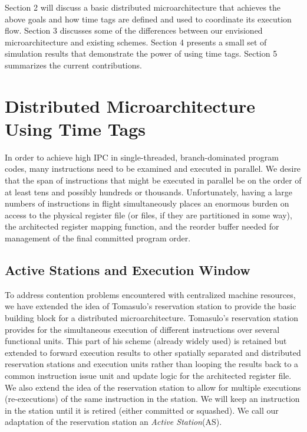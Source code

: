 \documentclass[10pt,twocolumn,dvips]{article}
\begin{document}
Section 2 will discuss a basic distributed microarchitecture that
achieves the above goals and how time tags are defined and used
to coordinate its execution flow.  
Section 3 discusses some of the differences between our envisioned
microarchitecture and existing schemes.
Section 4 presents a small set of simulation results that demonstrate
the power of using time tags. 
Section 5 
summarizes the current contributions.
\section{Distributed Microarchitecture Using Time Tags}
\vspace{-0.1in}
In order to achieve high IPC in single-threaded, branch-dominated 
program codes, many instructions need to be examined and executed
in parallel.  We desire that the span of instructions that might be
executed in parallel be on the order of at least tens and possibly hundreds
or thousands.  Unfortunately, having a large numbers of instructions
in flight simultaneously places an enormous burden on access to 
the physical register file (or files, if they are partitioned in some way),
the architected register mapping function, and the reorder buffer 
needed for
management of the final committed program order.
\vspace{-0.2in}
\subsection{Active Stations and Execution Window}
\vspace{-0.1in}
To address contention problems encountered with centralized
machine resources, we have extended the idea of Tomasulo's reservation
station \cite{Tom67} to provide the basic building block for a distributed
microarchitecture.  Tomasulo's reservation station provides for the
simultaneous execution of different instructions over several
functional units.  This part of his scheme (already widely used) is
retained but extended to forward execution results to other spatially
separated and distributed reservation stations and execution units
rather than looping the results back to a common instruction issue unit
and update logic for the architected register file.  We also extend the idea
of the reservation station to allow for multiple executions (re-executions)
of the same instruction in the station.  We will keep an 
instruction in the station until it is retired (either committed or 
squashed).  
We call our adaptation of the reservation station an 
{\em Active Station}(AS).  
\end{document}
